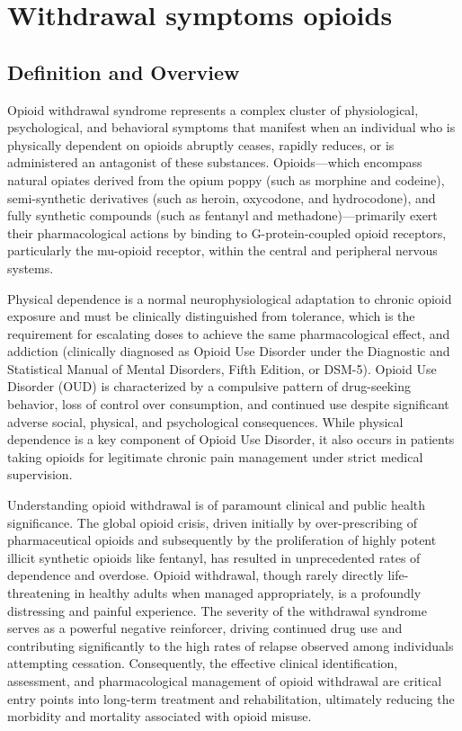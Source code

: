 \chapter{Withdrawal symptoms opioids}

\section*{Definition and Overview}
Opioid withdrawal syndrome represents a complex cluster of physiological, psychological, and behavioral symptoms that manifest when an individual who is physically dependent on opioids abruptly ceases, rapidly reduces, or is administered an antagonist of these substances. Opioids—which encompass natural opiates derived from the opium poppy (such as morphine and codeine), semi-synthetic derivatives (such as heroin, oxycodone, and hydrocodone), and fully synthetic compounds (such as fentanyl and methadone)—primarily exert their pharmacological actions by binding to G-protein-coupled opioid receptors, particularly the mu-opioid receptor, within the central and peripheral nervous systems.

Physical dependence is a normal neurophysiological adaptation to chronic opioid exposure and must be clinically distinguished from tolerance, which is the requirement for escalating doses to achieve the same pharmacological effect, and addiction (clinically diagnosed as Opioid Use Disorder under the Diagnostic and Statistical Manual of Mental Disorders, Fifth Edition, or DSM-5). Opioid Use Disorder (OUD) is characterized by a compulsive pattern of drug-seeking behavior, loss of control over consumption, and continued use despite significant adverse social, physical, and psychological consequences. While physical dependence is a key component of Opioid Use Disorder, it also occurs in patients taking opioids for legitimate chronic pain management under strict medical supervision.

Understanding opioid withdrawal is of paramount clinical and public health significance. The global opioid crisis, driven initially by over-prescribing of pharmaceutical opioids and subsequently by the proliferation of highly potent illicit synthetic opioids like fentanyl, has resulted in unprecedented rates of dependence and overdose. Opioid withdrawal, though rarely directly life-threatening in healthy adults when managed appropriately, is a profoundly distressing and painful experience. The severity of the withdrawal syndrome serves as a powerful negative reinforcer, driving continued drug use and contributing significantly to the high rates of relapse observed among individuals attempting cessation. Consequently, the effective clinical identification, assessment, and pharmacological management of opioid withdrawal are critical entry points into long-term treatment and rehabilitation, ultimately reducing the morbidity and mortality associated with opioid misuse.


